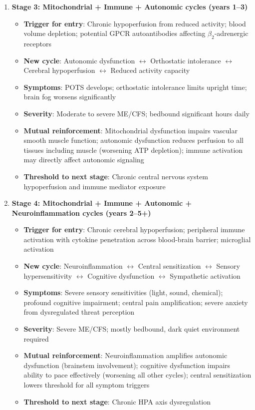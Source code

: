 \begin{enumerate}
    \item \textbf{Stage 3: Mitochondrial + Immune + Autonomic cycles (years 1--3)}
    \begin{itemize}
        \item \textbf{Trigger for entry}: Chronic hypoperfusion from reduced activity; blood volume depletion; potential GPCR autoantibodies affecting $\beta_2$-adrenergic receptors~\cite{Loebel2016,Bynke2020}
        \item \textbf{New cycle}: Autonomic dysfunction $\leftrightarrow$ Orthostatic intolerance $\leftrightarrow$ Cerebral hypoperfusion $\leftrightarrow$ Reduced activity capacity
        \item \textbf{Symptoms}: POTS develops; orthostatic intolerance limits upright time; brain fog worsens significantly
        \item \textbf{Severity}: Moderate to severe ME/CFS; bedbound significant hours daily
        \item \textbf{Mutual reinforcement}: Mitochondrial dysfunction impairs vascular smooth muscle function; autonomic dysfunction reduces perfusion to all tissues including muscle (worsening ATP depletion); immune activation may directly affect autonomic signaling
        \item \textbf{Threshold to next stage}: Chronic central nervous system hypoperfusion and immune mediator exposure
    \end{itemize}

    \item \textbf{Stage 4: Mitochondrial + Immune + Autonomic + Neuroinflammation cycles (years 2--5+)}
    \begin{itemize}
        \item \textbf{Trigger for entry}: Chronic cerebral hypoperfusion; peripheral immune activation with cytokine penetration across blood-brain barrier; microglial activation~\cite{Nakatomi2014neuroinflammation}
        \item \textbf{New cycle}: Neuroinflammation $\leftrightarrow$ Central sensitization $\leftrightarrow$ Sensory hypersensitivity $\leftrightarrow$ Cognitive dysfunction $\leftrightarrow$ Sympathetic activation
        \item \textbf{Symptoms}: Severe sensory sensitivities (light, sound, chemical); profound cognitive impairment; central pain amplification; severe anxiety from dysregulated threat perception
        \item \textbf{Severity}: Severe ME/CFS; mostly bedbound, dark quiet environment required
        \item \textbf{Mutual reinforcement}: Neuroinflammation amplifies autonomic dysfunction (brainstem involvement); cognitive dysfunction impairs ability to pace effectively (worsening all other cycles); central sensitization lowers threshold for all symptom triggers
        \item \textbf{Threshold to next stage}: Chronic HPA axis dysregulation
    \end{itemize}


\end{enumerate}
